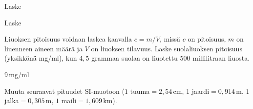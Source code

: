 \begin{tehtavasivu}
\begin{tehtava}
Laske
\begin{vastaus}
\end{vastaus}
\end{tehtava}


\begin{tehtava}
Laske
\begin{vastaus}
\end{vastaus}
\end{tehtava}

\begin{tehtava}
Liuoksen pitoisuus voidaan laskea kaavalla $c=m/V$, missä $c$ on pitoisuus, $m$ on liuenneen aineen määrä ja $V$ on liuoksen tilavuus. Laske suolaliuoksen pitoisuus (yksikkönä mg/ml), kun $4,5$ grammaa suolaa on liuotettu $500$ millilitraan liuosta. %
\begin{vastaus}
$9$\,mg/ml
\end{vastaus}
\end{tehtava}

\begin{tehtava}
Muuta seuraavat pituudet SI-muotoon ($1$ tuuma$ = 2,54$\,cm, $1$ jaardi$ = 0,914$\,m, $1$ jalka$ = 0,305$\,m, $1$ maili$ = 1,609$\,km).
\begin{vastaus}
\end{vastaus}
\end{tehtava}


\end{tehtavasivu}
